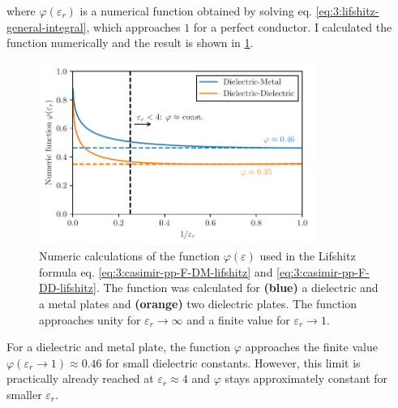 where $\varphi(\varepsilon_r)$ is a numerical function obtained by solving eq. \eqref{eq:3:lifshitz-general-integral}, which approaches $1$ for a perfect conductor. I calculated the function numerically and the result is shown in \cref{fig:3:lifshitz-function}.
\begin{figure}[!htbp]
  \centering
  \includegraphics[width=0.8\textwidth]{./../figures/casimir-lifshitz-function.pdf}
  \caption{Numeric calculations of the function $\varphi(\varepsilon)$ used in the Lifshitz formula eq. \eqref{eq:3:casimir-pp-F-DM-lifshitz} and \eqref{eq:3:casimir-pp-F-DD-lifshitz}. The function was calculated for \textbf{(blue)} a dielectric and a metal plates and \textbf{(orange)} two dielectric plates. The function approaches unity for $\varepsilon_r\rightarrow\infty$ and a finite value for $\varepsilon_r\rightarrow 1$.}
  \label{fig:3:lifshitz-function}
\end{figure}
For a dielectric and metal plate, the function $\varphi$ approaches the finite value $\varphi(\varepsilon_r \rightarrow 1) \approx 0.46$ for small dielectric constants. However, this limit is practically already reached at $\varepsilon_r \approx 4$ and $\varphi$ stays approximately constant for smaller $\varepsilon_r$.





